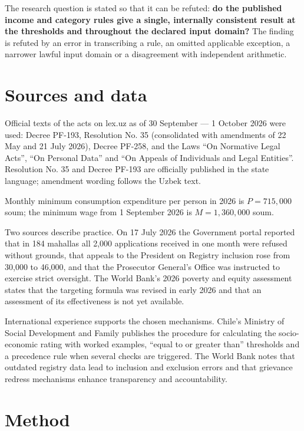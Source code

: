 \documentclass[12pt,a4paper]{extarticle}
\begin{document}
The research question is stated so that it can be refuted: \textbf{do the published income and category rules give a single, internally consistent result at the thresholds and throughout the declared input domain?} The finding is refuted by an error in transcribing a rule, an omitted applicable exception, a narrower lawful input domain or a disagreement with independent arithmetic.

\section{Sources and data}
Official texts of the acts on lex.uz as of 30 September — 1 October 2026 were used: Decree PF-193, Resolution No. 35 (consolidated with amendments of 22 May and 21 July 2026), Decree PF-258, and the Laws “On Normative Legal Acts”, “On Personal Data” and “On Appeals of Individuals and Legal Entities”\cite{ref1,ref2,ref3,ref7,ref9,ref20}. Resolution No. 35 and Decree PF-193 are officially published in the state language; amendment wording follows the Uzbek text.

Monthly minimum consumption expenditure per person in 2026 is $P=715{,}000$ soum\cite{ref5}; the minimum wage from 1 September 2026 is $M=1{,}360{,}000$ soum\cite{ref4}.

Two sources describe practice. On 17 July 2026 the Government portal reported that in 184 mahallas all 2,000 applications received in one month were refused without grounds, that appeals to the President on Registry inclusion rose from 30,000 to 46,000, and that the Prosecutor General’s Office was instructed to exercise strict oversight\cite{ref28}. The World Bank’s 2026 poverty and equity assessment states that the targeting formula was revised in early 2026 and that an assessment of its effectiveness is not yet available\cite{ref11}.

International experience supports the chosen mechanisms. Chile’s Ministry of Social Development and Family publishes the procedure for calculating the socio-economic rating with worked examples, “equal to or greater than” thresholds and a precedence rule when several checks are triggered\cite{ref32}. The World Bank notes that outdated registry data lead to inclusion and exclusion errors and that grievance redress mechanisms enhance transparency and accountability\cite{ref12}.

\section{Method}
\end{document}
